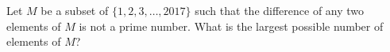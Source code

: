 Let $M$ be a subset of $\{1,2,3,\dots,2017\}$ such that the difference of any two elements of $M$ is not a prime number. What is the largest possible number of elements of $M$?
